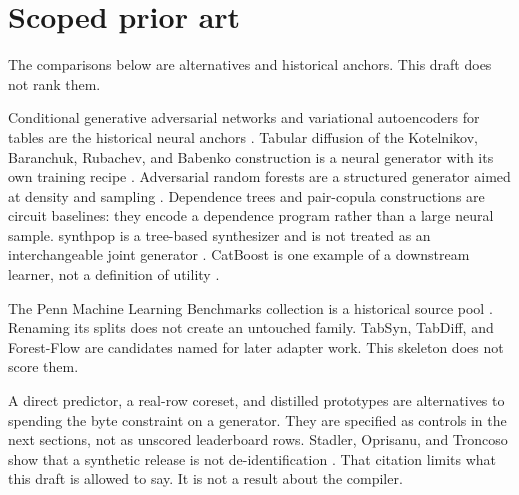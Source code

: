 \section{Scoped prior art}
The comparisons below are alternatives and historical anchors.
This draft does not rank them.

Conditional generative adversarial networks and variational autoencoders for tables are the historical neural anchors \citep{xu-ctgan}.
Tabular diffusion of the Kotelnikov, Baranchuk, Rubachev, and Babenko construction is a neural generator with its own training recipe \citep{kotelnikov-tabddpm}.
Adversarial random forests are a structured generator aimed at density and sampling \citep{watson-arf}.
Dependence trees \citep{chow-liu} and pair-copula constructions \citep{aas-paircopula} are circuit baselines: they encode a dependence program rather than a large neural sample.
synthpop is a tree-based synthesizer and is not treated as an interchangeable joint generator \citep{nowok-synthpop}.
CatBoost is one example of a downstream learner, not a definition of utility \citep{prokhorenkova-catboost}.

The Penn Machine Learning Benchmarks collection is a historical source pool \citep{olson-pmlb,romano-pmlb}.
Renaming its splits does not create an untouched family.
TabSyn, TabDiff, and Forest-Flow are candidates named for later adapter work.
This skeleton does not score them.

A direct predictor, a real-row coreset, and distilled prototypes are alternatives to spending the byte constraint on a generator.
They are specified as controls in the next sections, not as unscored leaderboard rows.
Stadler, Oprisanu, and Troncoso show that a synthetic release is not de-identification \citep{stadler-groundhog}.
That citation limits what this draft is allowed to say.
It is not a result about the compiler.

